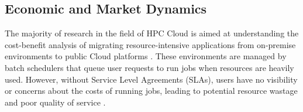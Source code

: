 \subsection{Economic and Market Dynamics}
\label{sec:economicmarketdynamics}


    The majority of research in the field of HPC Cloud is aimed at understanding the cost-benefit analysis of migrating resource-intensive applications from on-premise environments to public Cloud platforms \cite{netto_hpc_2019}. These environments are managed by batch schedulers that queue user requests to run jobs when resources are heavily used. However, without Service Level Agreements (SLAs), users have no visibility or concerns about the costs of running jobs, leading to potential resource wastage and poor quality of service \cite{netto_hpc_2019}.


